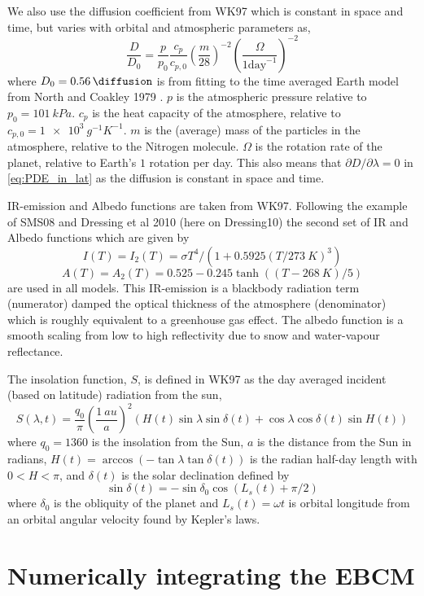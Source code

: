 \documentclass[12pt, onecolumn]{revtex4-2}    %
\begin{document}
We also use the diffusion coefficient from WK97 which is constant in space and time, but varies with orbital and atmospheric parameters as,
$$
    \frac{D}{D_0} = \frac{p}{p_0} \frac{c_p}{c_{p,0}} \left(\frac{m}{28}\right)^{-2} \left(\frac{\Omega}{1 \text{day}^{-1}}\right)^{-2}
$$
where $D_0 = \qty{0.56}{\diffusion}$ is from fitting to the time averaged Earth model from North and Coakley 1979 \cite{NC79}.
$p$ is the atmospheric pressure relative to $p_0 = \qty{101}{kPa}$.
$c_p$ is the heat capacity of the atmosphere, relative to $c_{p,0} = \qty{1e3}{g^{-1} K^{-1}}$.
$m$ is the (average) mass of the particles in the atmosphere, relative to the Nitrogen molecule.
$\Omega$ is the rotation rate of the planet, relative to Earth's $1$ rotation per day.
This also means that $\partial D / \partial \lambda = 0$ in \eqref{eq:PDE_in_lat} as the diffusion is constant in space and time.

IR-emission and Albedo functions are taken from WK97. Following the example of SMS08 and Dressing et al 2010 (here on Dressing10) \cite{Dressing10} the second set of IR and Albedo functions which are given by
$$
    I(T) = I_2(T) = \sigma T^4 / (1 + 0.5925 (T/\qty{273}{K}) ^ 3)
$$
$$
    A(T) = A_2(T) = 0.525 - 0.245 \tanh((T-\qty{268}{K}) / 5)
$$
are used in all models.
This IR-emission is a blackbody radiation term (numerator) damped the optical thickness of the atmosphere (denominator) which is roughly equivalent to a greenhouse gas effect.
The albedo function is a smooth scaling from low to high reflectivity due to snow and water-vapour reflectance.

The insolation function, $S$, is defined in WK97 as the day averaged incident (based on latitude) radiation from the sun,
$$
    S(\lambda, t) = \frac{q_0}{\pi} \left(\frac{\qty{1}{au}}{a}\right)^2 (H(t) \sin{\lambda} \sin{\delta(t)} + \cos{\lambda} \cos{\delta(t)} \sin{H(t)})
$$
where $q_0=1360$ is the insolation from the Sun,
$a$ is the distance from the Sun in radians,
$H(t) = \arccos(-\tan\lambda \tan \delta(t))$ is the radian half-day length with $0 < H < \pi$,
and $\delta(t)$ is the solar declination defined by
$$
    \sin\delta(t) = -\sin\delta_0 \cos(L_s(t) + \pi/2)
$$
where $\delta_0$ is the obliquity of the planet and $L_s(t) = \omega t$ is orbital longitude from an orbital angular velocity found by Kepler's laws.

\section{Numerically integrating the EBCM} \label{sec:solve_PDE}
\end{document}
